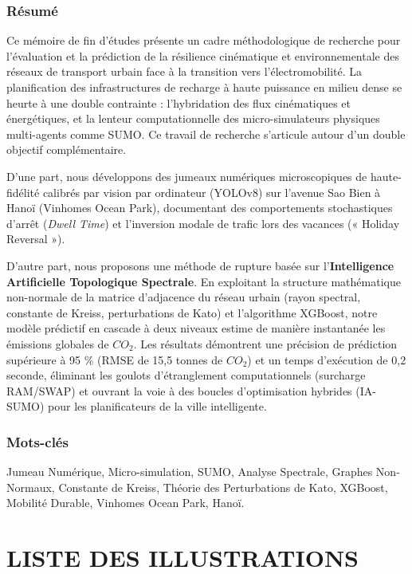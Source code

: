 \documentclass[10pt, a4paper]{article}
\begin{document}
\subsubsection{Résumé}\label{ruxe9sumuxe9}

Ce mémoire de fin d'études présente un cadre méthodologique de recherche
pour l'évaluation et la prédiction de la résilience cinématique et
environnementale des réseaux de transport urbain face à la transition
vers l'électromobilité. La planification des infrastructures de recharge
à haute puissance en milieu dense se heurte à une double contrainte :
l'hybridation des flux cinématiques et énergétiques, et la lenteur
computationnelle des micro-simulateurs physiques multi-agents comme
SUMO. Ce travail de recherche s'articule autour d'un double objectif
complémentaire.

D'une part, nous développons des jumeaux numériques microscopiques de
haute-fidélité calibrés par vision par ordinateur (YOLOv8) sur l'avenue
Sao Bien à Hanoï (Vinhomes Ocean Park), documentant des comportements
stochastiques d'arrêt (\emph{Dwell Time}) et l'inversion modale de
trafic lors des vacances (« Holiday Reversal »).

D'autre part, nous proposons une méthode de rupture basée sur
l'\textbf{Intelligence Artificielle Topologique Spectrale}. En
exploitant la structure mathématique non-normale de la matrice
d'adjacence du réseau urbain (rayon spectral, constante de Kreiss,
perturbations de Kato) et l'algorithme XGBoost, notre modèle prédictif
en cascade à deux niveaux estime de manière instantanée les émissions
globales de \(CO_2\). Les résultats démontrent une précision de
prédiction supérieure à 95 \% (RMSE de 15,5 tonnes de \(CO_2\)) et un
temps d'exécution de 0,2 seconde, éliminant les goulots d'étranglement
computationnels (surcharge RAM/SWAP) et ouvrant la voie à des boucles
d'optimisation hybrides (IA-SUMO) pour les planificateurs de la ville
intelligente.

\subsubsection{Mots-clés}\label{mots-cluxe9s}

Jumeau Numérique, Micro-simulation, SUMO, Analyse Spectrale, Graphes
Non-Normaux, Constante de Kreiss, Théorie des Perturbations de Kato,
XGBoost, Mobilité Durable, Vinhomes Ocean Park, Hanoï.

\newpage

\section{LISTE DES ILLUSTRATIONS}\label{liste-des-illustrations}
\end{document}
